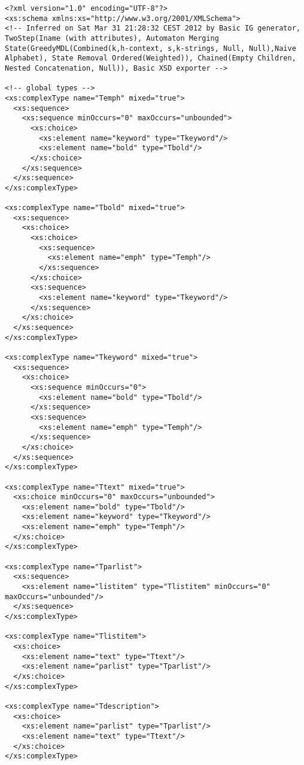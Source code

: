 \begin{lstlisting}[caption=Resulting XSD of Test Scenario B, frame=single, label=listing_xsd]
<?xml version="1.0" encoding="UTF-8"?>
<xs:schema xmlns:xs="http://www.w3.org/2001/XMLSchema">
<!-- Inferred on Sat Mar 31 21:28:32 CEST 2012 by Basic IG generator, TwoStep(Iname (with attributes), Automaton Merging State(GreedyMDL(Combined(k,h-context, s,k-strings, Null, Null),Naive Alphabet), State Removal Ordered(Weighted)), Chained(Empty Children, Nested Concatenation, Null)), Basic XSD exporter -->

<!-- global types -->
<xs:complexType name="Temph" mixed="true">
  <xs:sequence>
    <xs:sequence minOccurs="0" maxOccurs="unbounded">
      <xs:choice>
        <xs:element name="keyword" type="Tkeyword"/>
        <xs:element name="bold" type="Tbold"/>
      </xs:choice>
    </xs:sequence>
  </xs:sequence>
</xs:complexType>

<xs:complexType name="Tbold" mixed="true">
  <xs:sequence>
    <xs:choice>
      <xs:choice>
        <xs:sequence>
          <xs:element name="emph" type="Temph"/>
        </xs:sequence>
      </xs:choice>
      <xs:sequence>
        <xs:element name="keyword" type="Tkeyword"/>
      </xs:sequence>
    </xs:choice>
  </xs:sequence>
</xs:complexType>

<xs:complexType name="Tkeyword" mixed="true">
  <xs:sequence>
    <xs:choice>
      <xs:sequence minOccurs="0">
        <xs:element name="bold" type="Tbold"/>
      </xs:sequence>
      <xs:sequence>
        <xs:element name="emph" type="Temph"/>
      </xs:sequence>
    </xs:choice>
  </xs:sequence>
</xs:complexType>

<xs:complexType name="Ttext" mixed="true">
  <xs:choice minOccurs="0" maxOccurs="unbounded">
    <xs:element name="bold" type="Tbold"/>
    <xs:element name="keyword" type="Tkeyword"/>
    <xs:element name="emph" type="Temph"/>
  </xs:choice>
</xs:complexType>

<xs:complexType name="Tparlist">
  <xs:sequence>
    <xs:element name="listitem" type="Tlistitem" minOccurs="0" maxOccurs="unbounded"/>
  </xs:sequence>
</xs:complexType>

<xs:complexType name="Tlistitem">
  <xs:choice>
    <xs:element name="text" type="Ttext"/>
    <xs:element name="parlist" type="Tparlist"/>
  </xs:choice>
</xs:complexType>

<xs:complexType name="Tdescription">
  <xs:choice>
    <xs:element name="parlist" type="Tparlist"/>
    <xs:element name="text" type="Ttext"/>
  </xs:choice>
</xs:complexType>


\end{lstlisting}
